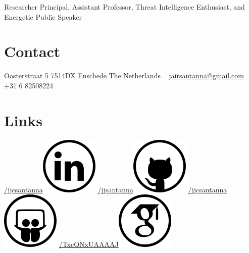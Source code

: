 \documentclass[print]{styles/friggeri-cv-mac} %
\begin{document}
{Researcher Principal, Assistant Professor, Threat Intelligence Enthusiast, and Energetic Public Speaker} 
\begin{aside} 
 \section{Contact}
 Oosterstraat 5
 7514DX Enschede
 The Netherlands
~
\href{mailto:jairsantanna@gmail.com}{jairsantanna@gmail.com}
+31 6 82508224
~
\section{Links}\hspace{-1cm}
\hspace{-0.5cm}
\href{https://www.linkedin.com/in/jjcsantanna}{/jjcsantanna}\includegraphics[scale=0.3]{img/linkedin.png}
\href{https://github.com/jjsantanna}{/jjsantanna\includegraphics[scale=0.3]{img/github.png}}
\href{http://www.slideshare.net/jjcsantanna}{/jjcsantanna}\includegraphics[scale=0.3]{img/slideshare.png}
\href{https://scholar.google.com/citations?user=TxcQNxUAAAAJ}{/TxcQNxUAAAAJ}\includegraphics[scale=0.3]{img/googlescholar.png}

\end{aside}
\end{document}
